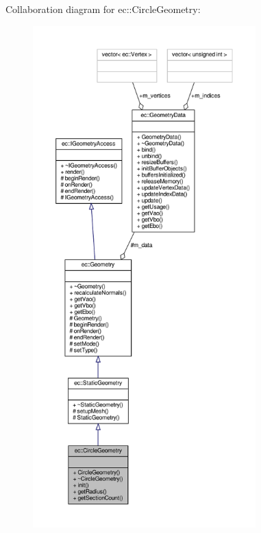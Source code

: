 Collaboration diagram for ec\+:\+:Circle\+Geometry\+:\nopagebreak
\begin{figure}[H]
\begin{center}
\leavevmode
\includegraphics[height=550pt]{classec_1_1_circle_geometry__coll__graph}
\end{center}
\end{figure}
